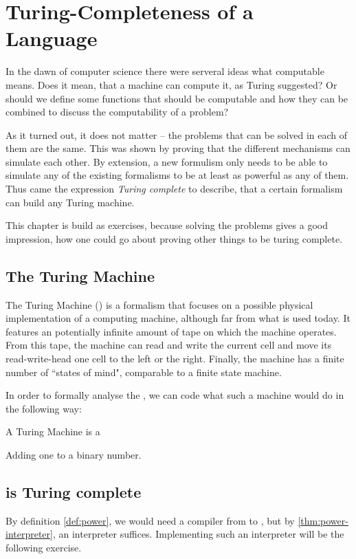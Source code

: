 \section{Turing-Completeness of a Language}
\label{sec:Turing Completeness}
In the dawn of computer science there were serveral ideas what computable 
means. Does it mean, that a machine can compute it, as Turing suggested? Or 
should we define some functions that should be computable and how they can be
combined to discuss the computability of a problem?

As it turned out, it does not matter -- the problems that can be solved in 
each of them are the same. This was shown by proving that the different 
mechanisms can simulate each other. By extension, a new formulism only needs 
to be able to simulate any of the existing formalisms to be at least as 
powerful as any of them. Thus came the expression {\em Turing complete} to 
describe, that a certain formalism can build any Turing machine.

This chapter is build as exercises, because solving the problems gives a good 
impression, how one could go about proving other things to be turing complete.

\subsection{The Turing Machine}
The Turing Machine (\TM) is a formalism that focuses on a possible physical 
implementation of a computing machine, although far from what is used today. 
It features an potentially infinite amount of tape on which the machine 
operates. From this tape, the machine can read and write the current cell and 
move its read-write-head one cell to the left or the right. Finally, the 
machine has a finite number of ``states of mind", comparable to a finite 
state machine.

In order to formally analyse the \TM, we can code what such a machine would 
do in the following way:

\begin{defn}
	\label{def:tm}
	A Turing Machine is a \TODO
\end{defn}

\begin{example}
	Adding one to a binary number. \TODO
\end{example}

\subsection{\WHILE is Turing complete}
By definition \ref{def:power}, we would need a compiler from \TM to \WHILE, 
but by \ref{thm:power-interpreter}, an interpreter suffices. Implementing such an 
interpreter will be the following exercise.

